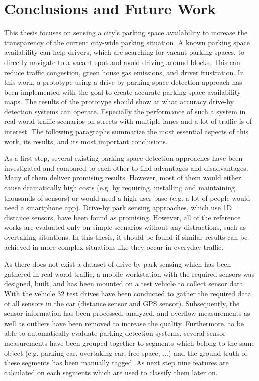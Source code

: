 \chapter{Conclusions and Future Work}
\label{chap:conclusion}



This thesis focuses on sensing a city's parking space availability to increase the transparency of the current city-wide parking situation. 
A known parking space availability can help drivers, which are searching for vacant parking spaces, to directly navigate to a vacant spot and avoid driving around blocks. This can reduce traffic congestion, green house gas emissions, and driver frustration. 
In this work, a prototype using a drive-by parking space detection approach has been implemented with the goal to create accurate parking space availability maps. The results of the prototype should show at what accuracy drive-by detection systems can operate. Especially the performance of such a system in real world traffic scenarios on streets with multiple lanes and a lot of traffic is of interest.
The following paragraphs summarize the most essential aspects of this work, its results, and its most important conclusions.



As a first step, several existing parking space detection approaches have been investigated and compared to each other to find advantages and disadvantages.
Many of them deliver promising results. However, most of them would either cause dramatically high costs (e.g. by requiring, installing and maintaining thousands of sensors) or would need a high user base (e.g. a lot of people would need a smartphone app). 
 Drive-by park sensing approaches, which use 1D distance sensors, have been found as promising. However, all of the reference works are evaluated only on simple scenarios without any distractions, such as overtaking situations. 
 In this thesis, it should be found if similar results can be achieved in more complex situations like they occur in everyday traffic.


As there does not exist a dataset of drive-by park sensing which has been gathered in real world traffic, a mobile workstation with the required sensors was designed, built, and has been mounted on a test vehicle to collect sensor data. With the vehicle 32 test drives have been conducted to gather the required data of all sensors in the car (distance sensor and GPS sensor). Subsequently, the sensor information has been processed, analyzed, and overflow measurements as well as outliers have been removed to increase the quality. Furthermore, to be able to automatically evaluate parking detection systems, several sensor measurements have been grouped together to segments which belong to the same object (e.g. parking car, overtaking car, free space, ...) and the ground truth of these segments has been manually tagged. As next step nine features are calculated on each segments which are used to classify them later on.








